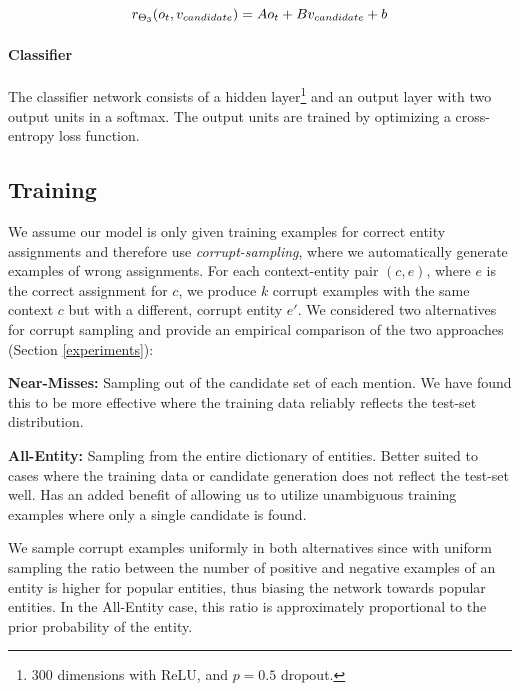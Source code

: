 \documentclass[11pt,a4paper]{article}
\begin{document}
	\begin{equation}
	\label{eq3}
	r_{\Theta_3}(o_t, v_{candidate}) = Ao_t + Bv_{candidate} + b \\
	\end{equation}
	
	\paragraph{Classifier}
	The classifier network consists of a hidden layer\footnote{300 dimensions with ReLU, and $p=0.5$ dropout.} and an output layer with two output units in a softmax. The output units are trained by optimizing a cross-entropy loss function.
	
	\subsection{Training}
	
	We assume our model is only given training examples for correct entity assignments and therefore use \textit{corrupt-sampling}, where we automatically generate examples of wrong assignments. For each context-entity pair $(c,e)$, where $e$ is the correct assignment for $c$, we produce $k$ corrupt examples with the same context $c$ but with a different, corrupt entity $e'$. We considered two alternatives for corrupt sampling and provide an empirical comparison of the two approaches (Section \ref{experiments}):
	
	\begin{description}
	\item{\textbf{Near-Misses:}} 
	Sampling out of the candidate set of each mention. We have found this to be more effective where the training data reliably reflects the test-set distribution.
	\item{\textbf{All-Entity:}} 
	Sampling from the entire dictionary of entities. Better suited to cases where the training data or candidate generation does not reflect the test-set well. Has an added benefit of allowing us to utilize unambiguous training examples where only a single candidate is found.
	\end{description}
	
	We sample corrupt examples uniformly in both alternatives since with uniform sampling the ratio between the number of positive and negative examples of an entity is higher for popular entities, thus biasing the network towards popular entities. In the All-Entity case, this ratio is approximately proportional to the prior probability of the entity. 
	
\end{document}
